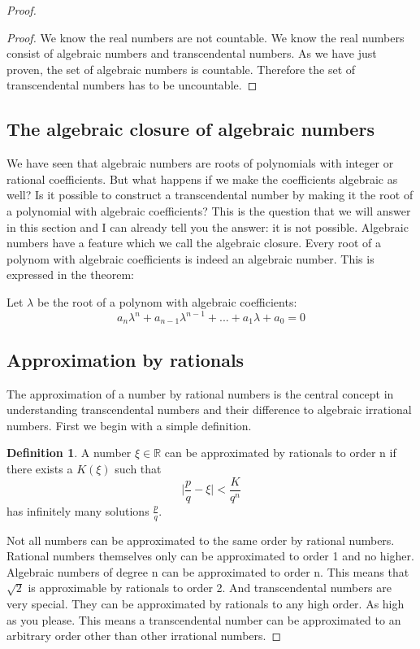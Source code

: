 \documentclass{article}
\theoremstyle{definition}
\newtheorem{definition}{Definition}[section]
\begin{document}
\begin{proof}
\begin{proof}
    We know the real numbers are not countable. We know the real numbers consist of algebraic numbers and transcendental numbers. As we have just proven, the set of algebraic numbers is countable. Therefore the set of transcendental numbers has to be uncountable.
\end{proof}

\subsection{The algebraic closure of algebraic numbers}
We have seen that algebraic numbers are roots of polynomials with integer or rational coefficients. But what happens if we make the coefficients algebraic as well? Is it possible to construct a transcendental number by making it the root of a polynomial with algebraic coefficients? This is the question that we will answer in this section and I can already tell you the answer: it is not possible. Algebraic numbers have a feature which we call the algebraic closure. Every root of a polynom with algebraic coefficients is indeed an algebraic number. This is expressed in the theorem:
\begin{theorem}
    Let $\lambda$ be the root of a polynom with algebraic coefficients:
    \begin{equation}
        a_n\lambda^n + a_{n-1}\lambda^{n-1} + ... + a_1 \lambda + a_0 = 0
    \end{equation}
   
\end{theorem}

\subsection{Approximation by rationals}
The approximation of a number by rational numbers is the central concept in understanding transcendental numbers and their difference to algebraic irrational numbers. First we begin with a simple definition.


\begin{definition}
    A number $\xi \in \mathbb{R}$ can be approximated by rationals to order n if there exists a $K(\xi)$ such that
    \begin{equation}
        \mid \frac{p}{q}-\xi \mid < \frac{K}{q^n}
    \end{equation}
    has infinitely many solutions $\frac{p}{q}$.
\end{definition}
Not all numbers can be approximated to the same order by rational numbers. Rational numbers themselves only can be approximated to order 1 and no higher. Algebraic numbers of degree n can be approximated to order n. This means that $\sqrt{2}$ is approximable by rationals to order 2. And transcendental numbers are very special. They can be approximated by rationals to any high order. As high as you please. This means a transcendental number can be approximated to an arbitrary order other than other irrational numbers.



\end{proof}
\end{document}
